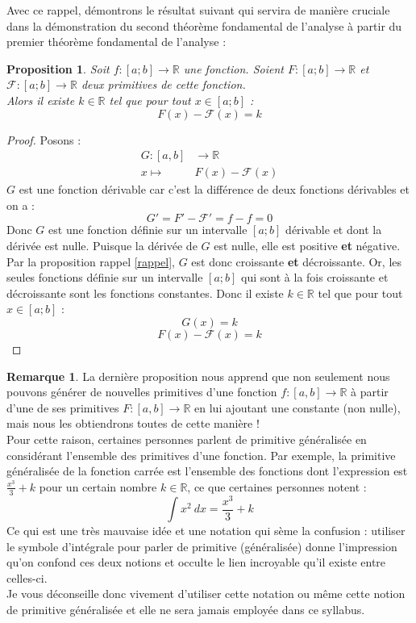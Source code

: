 \documentclass[a4paper,fontsize=13pt]{scrreprt}
\theoremstyle{plain}
\newtheorem{pro}[subsection]{Proposition}
\theoremstyle{definition}
\newtheorem{rema}[subsection]{Remarque}
\newcommand{\rr}{\mathbb{R}}
\begin{document}
Avec ce rappel, démontrons le résultat suivant qui servira de manière cruciale dans la démonstration du second théorème fondamental de l'analyse à partir du premier théorème fondamental de l'analyse :
\begin{pro} \label{deuxprim}
Soit $f : [a;b] \to \rr$ une fonction. Soient $F : [a;b] \to \rr$ et $\mathcal{F} : [a;b] \to \rr$ deux primitives de cette fonction. \\
Alors il existe $k \in \rr$ tel que pour tout $x \in [a;b]$ :
$$F(x) - \mathcal{F}(x) = k$$
\end{pro}
\begin{proof}
Posons :
\begin{align*}
G : [a,b] &\to \rr \\
x \mapsto& F(x) - \mathcal{F}(x)
\end{align*}
$G$ est une fonction dérivable car c'est la différence de deux fonctions dérivables et on a :
$$G' = F' - \mathcal{F}' =  f-f =0$$
Donc $G$ est une fonction définie sur un intervalle $[a;b]$ dérivable et dont la dérivée est nulle. Puisque la dérivée de $G$ est nulle, elle est positive \textbf{et} négative. Par la proposition rappel \ref{rappel}, $G$ est donc croissante \textbf{et} décroissante. Or, les seules fonctions définie sur un intervalle $[a;b]$ qui sont à la fois croissante et décroissante sont les fonctions constantes. Donc il existe $k \in \rr$ tel que pour tout $x \in [a;b]$ :
$$G(x) = k$$
$$F(x) - \mathcal{F}(x) = k$$
\end{proof}

\begin{rema}
La dernière proposition nous apprend que non seulement nous pouvons générer de nouvelles primitives d'une fonction $f : [a,b] \to \rr $ à partir d'une de ses primitives $F : [a,b] \to \rr$ en lui ajoutant une constante (non nulle), mais nous les obtiendrons toutes de cette manière ! \\
Pour cette raison, certaines personnes parlent de \og primitive généralisée \fg{} en considérant l'ensemble des primitives d'une fonction. Par exemple, la \og primitive généralisée \fg{} de la fonction carrée est l'ensemble des fonctions dont l'expression est $\frac{x^3}{3} + k$ pour un certain nombre $k \in \rr$, ce que certaines personnes notent :
$$\int x^2~dx = \frac{x^3}{3} + k$$
Ce qui est une très mauvaise idée et une notation qui sème la confusion : utiliser le symbole d'intégrale pour parler de primitive (généralisée) donne l'impression qu'on confond ces deux notions et occulte le lien incroyable qu'il existe entre celles-ci. \\
Je vous déconseille donc vivement d'utiliser cette notation ou même cette notion de \og primitive généralisée \fg{} et elle ne sera jamais employée dans ce syllabus.
\end{rema}
\end{document}
